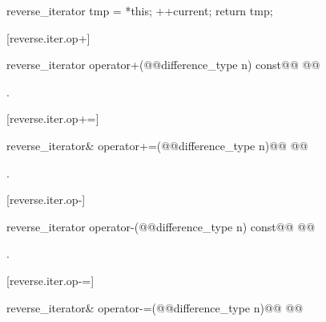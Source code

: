 \begin{itemdescr}
\pnum
\effects
\begin{codeblock}
reverse_iterator tmp = *this;
++current;
return tmp;
\end{codeblock}
\end{itemdescr}

[reverse.iter.op+]{}

%
\begin{itemdecl}
reverse_iterator
  operator+(@@difference_type n) const@\removed{;}@
    @@
\end{itemdecl}

\begin{itemdescr}
\pnum
\returns
{}.
\end{itemdescr}

[reverse.iter.op+=]{}

%
\begin{itemdecl}
reverse_iterator&
  operator+=(@@difference_type n)@\removed{;}@
    @@
\end{itemdecl}

\begin{itemdescr}
\pnum
\effects
{}

\pnum
\returns
{}.
\end{itemdescr}

[reverse.iter.op-]{}

%
\begin{itemdecl}
reverse_iterator
  operator-(@@difference_type n) const@\removed{;}@
    @@
\end{itemdecl}

\begin{itemdescr}
\pnum
\returns
{}.
\end{itemdescr}

[reverse.iter.op-=]{}

%
\begin{itemdecl}
reverse_iterator&
  operator-=(@@difference_type n)@\removed{;}@
    @@
\end{itemdecl}

